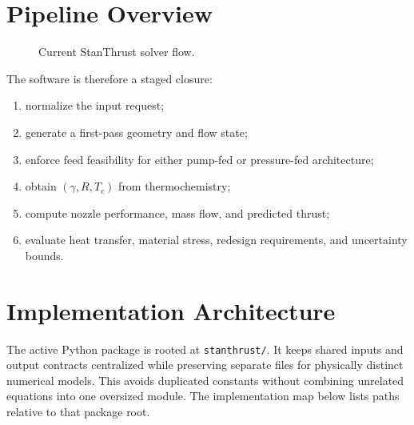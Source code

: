 \documentclass[11pt]{article}
\begin{document}
\section{Pipeline Overview}
\begin{figure}[H]
\centering
{}
\caption{Current StanThrust solver flow.}
\end{figure}

The software is therefore a staged closure:
\begin{enumerate}[leftmargin=6mm]
\item normalize the input request;
\item generate a first-pass geometry and flow state;
\item enforce feed feasibility for either pump-fed or pressure-fed architecture;
\item obtain $(\gamma, R, T_c)$ from thermochemistry;
\item compute nozzle performance, mass flow, and predicted thrust;
\item evaluate heat transfer, material stress, redesign requirements, and uncertainty bounds.
\end{enumerate}

\section{Implementation Architecture}
The active Python package is rooted at \texttt{stanthrust/}. It keeps shared inputs and output contracts centralized while preserving separate files for physically distinct numerical models. This avoids duplicated constants without combining unrelated equations into one oversized module. The implementation map below lists paths relative to that package root.
\end{document}
